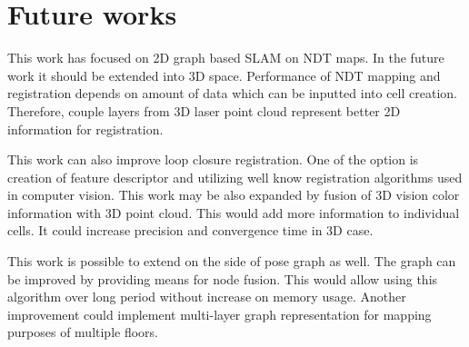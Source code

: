 \chapter{Future works}

This work has focused on 2D graph based \gls{SLAM} on \gls{NDT} maps. In the future work it should be extended into 3D space. Performance of \gls{NDT} mapping and registration depends on amount of data which can be inputted into cell creation. Therefore, couple layers from 3D laser point cloud represent better 2D information for registration.

This work can also improve loop closure registration. One of the option is creation of feature descriptor and utilizing well know registration algorithms used in computer vision. This work may be also expanded by fusion of 3D vision color information with 3D point cloud. This would add more information to individual cells. It could increase precision and convergence time in 3D case.  

This work is possible to extend on the side of pose graph as well. The graph can be improved by providing means for node fusion. This would allow using this algorithm over long period without increase on memory usage. Another improvement could implement multi-layer graph representation for mapping purposes of multiple floors. 